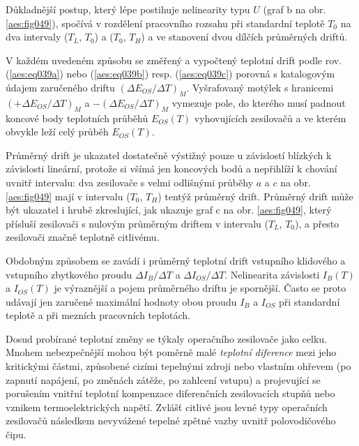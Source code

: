         Důkladnější postup, který lépe postihuje nelinearity typu \(U\) (graf b na obr.
        \ref{aes:fig049}), spočívá v rozdělení pracovního rozsahu při standardní teplotě \(T_0\) na
        dva intervaly (\(T_L\), \(T_0\)) a (\(T_0\), \(T_H\)) a ve stanovení dvou dílčích průměrných
        driftů.

        V každém uvedeném způsobu se změřený a vypočtený teplotní drift podle rov.
        (\ref{aes:eq039a}) nebo (\ref{aes:eq039b}) resp. (\ref{aes:eq039c}) porovná s katalogovým
        údajem zaručeného driftu \((\Delta E_{OS}/\Delta T)_M\). Vyšrafovaný motýlek s hranicemi
        \((+\Delta E_{OS}/\Delta T)_M\) a \(-(\Delta E_{OS}/\Delta T)_M\) vymezuje pole, do kterého
        musí padnout koncové body teplotních průběhů \(E_{OS}(T)\) vyhovujících zesilovačů a ve
        kterém obvykle leží celý průběh \(E_{OS}(T)\).

        Průměrný drift je ukazatel dostatečně výstižný pouze u závislostí blízkých k závislosti
        lineární, protože si všímá jen koncových bodů a nepřihlíží k chování uvnitř intervalu: dva
        zesilovače s velmi odlišnými průběhy \(a\) a \(c\) na obr. \ref{aes:fig049} mají v intervalu
        (\(T_0\), \(T_H\)) tentýž průměrný drift. Průměrný drift může být ukazatel i hrubě
        zkreslující, jak ukazuje graf c na obr. \ref{aes:fig049}, který přísluší zesilovači s
        nulovým průměrným driftem v intervalu (\(T_L\), \(T_0\)), a přesto zesilovači značně
        teplotně citlivému.

        Obdobným způsobem se zavádí i průměrný teplotní drift vstupního klidového a vstupního
        zbytkového proudu \(\Delta I_B/\Delta T\) a \(\Delta I_{OS}/\Delta T\). Nelinearita
        závislosti \(I_B(T)\) a \(I_{OS}(T)\) je výraznější a pojem průměrného driftu je spornější.
        Často se proto udávají jen zaručené maximální hodnoty obou proudu \(I_B\) a \(I_{OS}\) při
        standardní teplotě a při mezních pracovních teplotách.

        Dosud probírané teplotní změny se týkaly operačního zesilovače jako celku. Mnohem
        nebezpečnější mohou být poměrně malé \emph{teplotní diference} mezi jeho kritickými částmi,
        způsobené cizími tepelnými zdroji nebo vlastním ohřevem (po zapnutí napájení, po změnách
        zátěže, po zahlcení vstupu) a projevující se porušením vnitřní teplotní kompenzace
        diferenčních zesilovacích stupňů nebo vznikem termoelektrických napětí. Zvlášť citlivé jsou
        levné typy operačních zesilovačů následkem nevyvážené tepelné zpětné vazby uvnitř
        polovodičového čipu.

